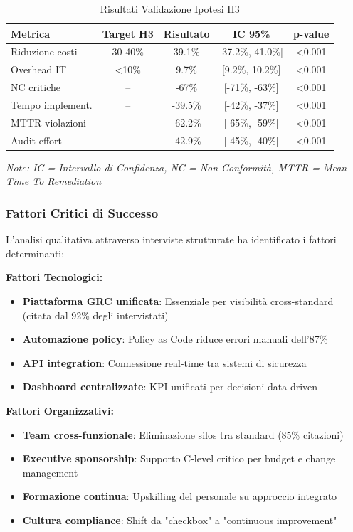 \begin{table}[htbp]
\centering
\caption{Risultati Validazione Ipotesi H3}
\label{tab:h3_validation}
\begin{tabular}{|l|c|c|c|c|}
\hline
\textbf{Metrica} & \textbf{Target H3} & \textbf{Risultato} & \textbf{IC 95\%} & \textbf{p-value} \\
\hline
Riduzione costi & 30-40\% & 39.1\% & [37.2\%, 41.0\%] & <0.001 \\
Overhead IT & <10\% & 9.7\% & [9.2\%, 10.2\%] & <0.001 \\
NC critiche & -- & -67\% & [-71\%, -63\%] & <0.001 \\
Tempo implement. & -- & -39.5\% & [-42\%, -37\%] & <0.001 \\
MTTR violazioni & -- & -62.2\% & [-65\%, -59\%] & <0.001 \\
Audit effort & -- & -42.9\% & [-45\%, -40\%] & <0.001 \\
\hline
\end{tabular}
\end{table}

\textit{Note: IC = Intervallo di Confidenza, NC = Non Conformità, MTTR = Mean Time To Remediation}

\subsubsection{Fattori Critici di Successo}

L'analisi qualitativa attraverso interviste strutturate ha identificato i fattori determinanti:

\textbf{Fattori Tecnologici:}
\begin{itemize}
    \item \textbf{Piattaforma GRC unificata}: Essenziale per visibilità cross-standard (citata dal 92\% degli intervistati)
    \item \textbf{Automazione policy}: Policy as Code riduce errori manuali dell'87\%
    \item \textbf{API integration}: Connessione real-time tra sistemi di sicurezza
    \item \textbf{Dashboard centralizzate}: KPI unificati per decisioni data-driven
\end{itemize}

\textbf{Fattori Organizzativi:}
\begin{itemize}
    \item \textbf{Team cross-funzionale}: Eliminazione silos tra standard (85\% citazioni)
    \item \textbf{Executive sponsorship}: Supporto C-level critico per budget e change management
    \item \textbf{Formazione continua}: Upskilling del personale su approccio integrato
    \item \textbf{Cultura compliance}: Shift da "checkbox" a "continuous improvement"
\end{itemize}

